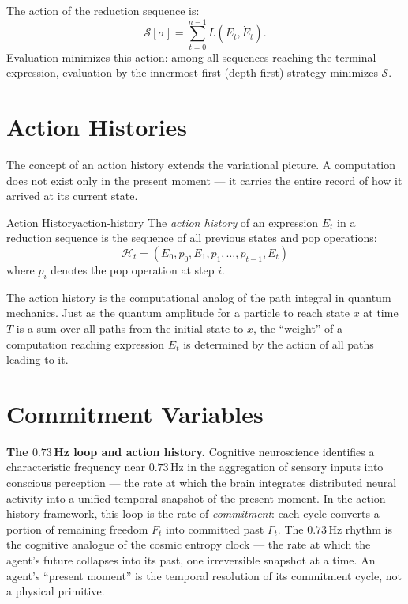 The action of the reduction sequence is:
\[
  \mathcal{S}[\sigma] = \sum_{t=0}^{n-1} L(E_t, \dot{E}_t).
\]
Evaluation minimizes this action: among all sequences reaching the
terminal expression, evaluation by the innermost-first (depth-first)
strategy minimizes $\mathcal{S}$.

\section{Action Histories}

The concept of an action history extends the variational picture.
A computation does not exist only in the present moment — it carries the
entire record of how it arrived at its current state.

\begin{definition}{Action History}{action-history}
  The \emph{action history} of an expression $E_t$ in a reduction
  sequence is the sequence of all previous states and pop operations:
  \[
    \mathcal{H}_t = (E_0, p_0, E_1, p_1, \ldots, p_{t-1}, E_t)
  \]
  where $p_i$ denotes the pop operation at step $i$.
\end{definition}

The action history is the computational analog of the path integral
in quantum mechanics. Just as the quantum amplitude for a particle to
reach state $x$ at time $T$ is a sum over all paths from the initial
state to $x$, the ``weight'' of a computation reaching expression $E_t$
is determined by the action of all paths leading to it.

\section{Commitment Variables}

\begin{remark}
  \textbf{The $0.73\,$Hz loop and action history.}
  Cognitive neuroscience identifies a characteristic frequency near
  $0.73\,$Hz in the aggregation of sensory inputs into conscious
  perception — the rate at which the brain integrates distributed
  neural activity into a unified temporal snapshot of the present moment.
  In the action-history framework, this loop is the rate of
  \emph{commitment}: each cycle converts a portion of remaining freedom
  $F_t$ into committed past $\Gamma_t$. The $0.73\,$Hz rhythm is the
  cognitive analogue of the cosmic entropy clock — the rate at which
  the agent's future collapses into its past, one irreversible snapshot
  at a time. An agent's ``present moment'' is the temporal resolution
  of its commitment cycle, not a physical primitive.
\end{remark}


